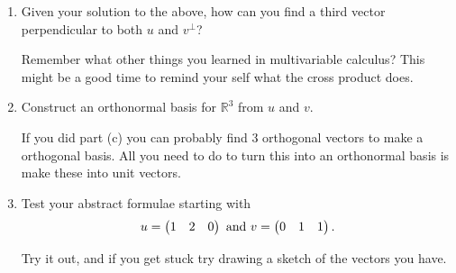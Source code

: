 {\begin{enumerate}
Now you finish simplifying and see if you can figure out what $\theta $ has to be.

\item Given your solution to the above, how can you find a third vector perpendicular to both $u$ and $v^\bot$?

Remember what other things you learned in multivariable calculus? This might be a good time to remind your self what the cross product does.

\item  Construct an orthonormal basis for $\mathbb{R}^3$ from $u$ and $v$.

If you did part (c) you can probably find 3 orthogonal vectors to make a orthogonal basis. All you need to do to turn this into an orthonormal  basis is make these into unit vectors. 

\item  Test your abstract formulae starting with 
\[
u=\begin{pmatrix} 1 & 2 & 0 \end{pmatrix} \text{ and } v=\begin{pmatrix} 0 & 1 & 1 \end{pmatrix}.
\]

Try it out, and if you get stuck try drawing a sketch of the vectors you have.



\end{enumerate}


} %

